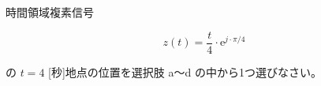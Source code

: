 時間領域複素信号 

\[
z(t) = \frac{t}{4} \cdot \textrm{e}^{j \cdot \pi / 4}
\]

\medskip
\noindent の $t = 4$ [秒]地点の位置を選択肢 a〜d の中から1つ選びなさい。
